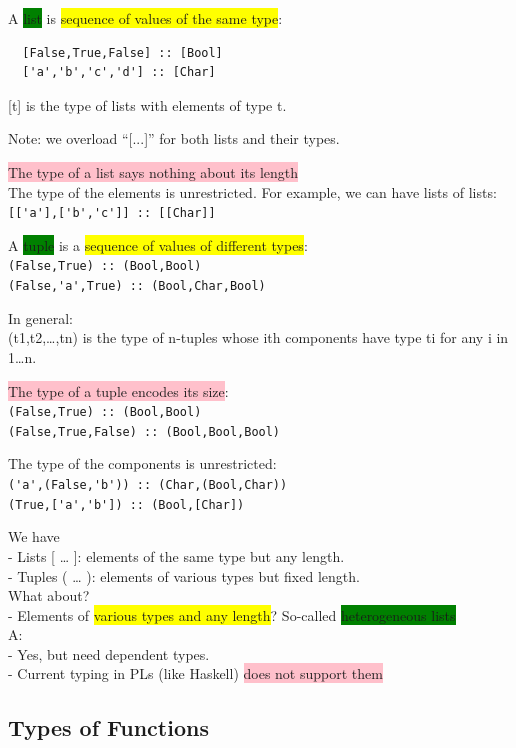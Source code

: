 \documentclass[tikz,border=10pt]{project_plan}
\begin{document}
A \colorbox{green}{list} is \colorbox{yellow}{sequence of values of the same type}:
\begin{lstlisting}
  [False,True,False] :: [Bool]
  ['a','b','c','d'] :: [Char]
\end{lstlisting}

[t] is the type of lists with elements of type t.

Note: we overload “[...]” for both lists and their types.

\colorbox{pink}{The type of a list says nothing about its length}\\
The type of the elements is unrestricted. For example,
we can have lists of lists:\\
\lstinline|[['a'],['b','c']] :: [[Char]]|

A \colorbox{green}{tuple} is a \colorbox{yellow}{sequence of values of different types}:\\
\lstinline|(False,True) :: (Bool,Bool)|\\
\lstinline|(False,'a',True) :: (Bool,Char,Bool)|

In general:\\
(t1,t2,…,tn) is the type of n-tuples whose ith components have type ti for any i in 1…n.

\colorbox{pink}{The type of a tuple encodes its size}:\\
\lstinline|(False,True) :: (Bool,Bool)|\\
\lstinline|(False,True,False) :: (Bool,Bool,Bool)|

The type of the components is unrestricted:\\
\lstinline|('a',(False,'b')) :: (Char,(Bool,Char))|\\
\lstinline|(True,['a','b']) :: (Bool,[Char])|

We have\\
- Lists [ … ]: elements of the same type but any length.\\
- Tuples ( … ): elements of various types but fixed length.\\
What about?\\
- Elements of \colorbox{yellow}{various types and any length}? So-called \colorbox{green}{heterogeneous lists}\\
A:\\
- Yes, but need dependent types.\\
- Current typing in PLs (like Haskell) \colorbox{pink}{does not support them}

\subsection{Types of Functions}
\end{document}
